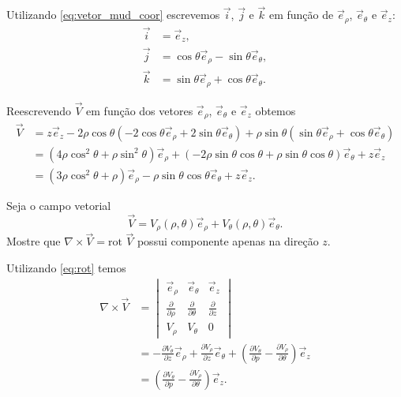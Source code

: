 \documentclass[a4paper,12pt, leqno, answers]{exam}
\newcommand{\devp}[2]{\frac{\partial #1}{\partial #2}}
\begin{document}
\begin{questions}
\begin{solution}
        Utilizando \eqref{eq:vetor_mud_coor} escrevemos $\vec{i}$, $\vec{j}$ e $\vec{k}$ em fun\c{c}\~{a}o de $\vec{e}_\rho$, $\vec{e}_\theta$ e $\vec{e}_z$:
        \begin{align*}
            \vec{i} &= \vec{e}_z, \\
            \vec{j} &= \cos \theta \vec{e}_\rho - \sin \theta \vec{e}_\theta, \\
            \vec{k} &= \sin \theta \vec{e}_\rho + \cos \theta \vec{e}_\theta.
        \end{align*}
  
        Reescrevendo $\vec{V}$ em fun\c{c}\~{a}o dos vetores $\vec{e}_\rho$, $\vec{e}_\theta$ e $\vec{e}_z$ obtemos
        \begin{align*}
            \vec{V} &= z \vec{e}_z - 2 \rho \cos \theta \left(-2 \cos \theta \vec{e}_\rho + 2 \sin \theta \vec{e}_\theta\right) + \rho \sin \theta \left(\sin \theta \vec{e}_\rho + \cos \theta \vec{e}_\theta\right) \\
            &= \left(4 \rho \cos^2 \theta + \rho \sin^2 \theta\right) \vec{e}_\rho + \left( -2 \rho \sin \theta \cos \theta + \rho \sin \theta \cos \theta\right) \vec{e}_\theta + z \vec{e}_z \\
            &= \left(3 \rho \cos^2 \theta + \rho\right) \vec{e}_\rho - \rho \sin \theta \cos \theta \vec{e}_\theta + z \vec{e}_z.
        \end{align*}
    \end{solution}
  
    \question Seja o campo vetorial
    \[
    \vec{V} = V_\rho(\rho, \theta) \vec{e}_\rho + V_\theta(\rho, \theta) \vec{e}_\theta.
    \]
    Mostre que $\nabla \times \vec{V} = \mbox{rot } \vec{V}$ possui componente apenas na dire\c{c}\~{a}o $z$.
    \begin{solution}
        Utilizando \eqref{eq:rot} temos
        \begin{align*}
            \nabla \times \vec{V} &= \begin{vmatrix}
                  \vec{e}_\rho & \vec{e}_\theta & \vec{e}_z \\
                  \devp{}{\rho} & \devp{}{\theta} & \devp{}{z} \\
                  V_\rho & V_\theta & 0
            \end{vmatrix} \\
            &= - \devp{V_\theta}{z} \vec{e}_\rho + \devp{V_\rho}{z} \vec{e}_\theta + \left(\devp{V_\theta}{p} - \devp{V_\rho}{\theta}\right) \vec{e}_z \\
            &= \left(\devp{V_\theta}{p} - \devp{V_\rho}{\theta}\right) \vec{e}_z.
        \end{align*}
    \end{solution}
  

\end{questions}
\end{document}
